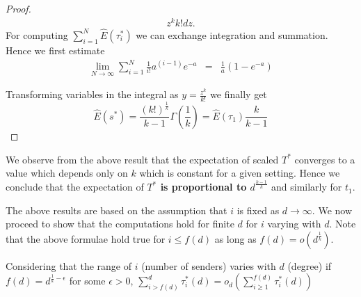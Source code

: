 \begin{proof}
\begin{eqnarray}
{{z^{k}}{k!}}dz .
\end{eqnarray}%
For computing $\mathop{\displaystyle \sum }\limits_{i=1}^{N}\hat E\left(
\tau _{i}^{\ast }\right) $ we can exchange integration and summation. Hence
we first estimate 
\begin{equation}
\begin{aligned} \lim_{N\rightarrow \infty }\mathop{\displaystyle \sum
}\limits_{i=1}^{N}\frac{1}{ i !}a^{\left( i-1\right) }e^{-a}
&=&\frac{1}{a}\left(
1-e^{-a}\right)
\end{aligned}
\end{equation}

Transforming variables in the integral as $y=\frac{z^{k}}{k!}$ we
finally get 
\begin{equation}
\hat E \left( s^{\ast }\right) =\frac{\left( k!\right) ^{\frac{1}{k}}}{k-1%
}\Gamma \left( \frac{1}{k}\right)= \hat E(\tau_1)\frac{k}{k-1}
\end{equation}

\end{proof}

We observe from the above result that the expectation of scaled $T^{*}$ converges to a value which depends only on $k$ which is constant for a given setting. 
Hence we conclude that the expectation of {\bf $T^{*}$ is proportional to $d^{\frac{k-1}{k}}$} and similarly for $t_1$.

The above results are based on the assumption that $i$ is fixed as  
$d\rightarrow \infty .$  
We now proceed to show that the computations hold for finite $d$ for $i$ varying with $d$.
Note that the above formulae hold true for $i\leq f\left( d\right) $ as
long as $f\left( d\right) =o\left( d^{\frac{1}{k}}\right) .$ 


\begin{theorem}
\label{theorem-3}
Considering that the range of $i$ (number of senders) varies with $d$ (degree) if $f\left( d\right) =d^{\frac{1}{k}-\epsilon }$
for some $\epsilon >0$, %
$\sum_{i>f\left( d\right) }^{d}\tau _{i}^{\ast }\left( d\right) =o_{d}\left(
\sum_{i\geq 1}^{f\left( d\right) }\tau _{i}^{\ast }\left( d\right) \right) $
\end{theorem}

